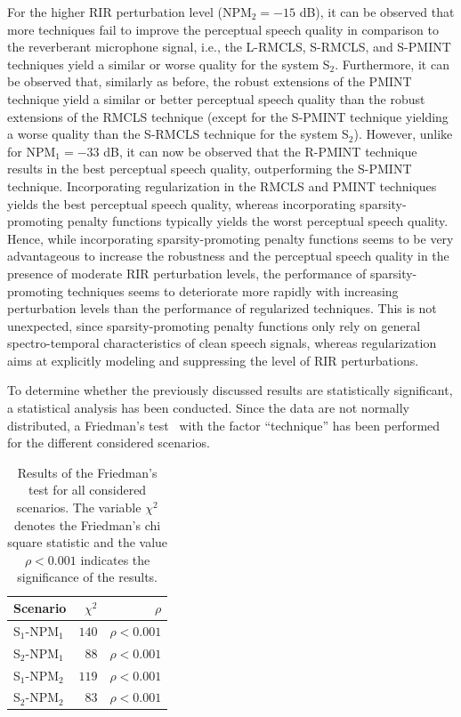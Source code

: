 \documentclass[fleqn]{aes2e}
\begin{document}
For the higher RIR perturbation level (NPM$_2 = -15$ dB), it can be observed that more techniques fail to improve the perceptual speech quality in comparison to the reverberant microphone signal, i.e., the L-RMCLS, S-RMCLS, and S-PMINT techniques yield a similar or worse quality for the system S$_2$.
Furthermore, it can be observed that, similarly as before, the robust extensions of the PMINT technique yield a similar or better perceptual speech quality than the robust extensions of the RMCLS technique (except for the S-PMINT technique yielding a worse quality than the S-RMCLS technique for the system S$_2$).
However, unlike for NPM$_1 = -33$ dB, it can now be observed that the R-PMINT technique results in the best perceptual speech quality, outperforming the S-PMINT technique.
Incorporating regularization in the RMCLS and PMINT techniques yields the best perceptual speech quality, whereas incorporating sparsity-promoting penalty functions typically yields the worst perceptual speech quality.
Hence, while incorporating sparsity-promoting penalty functions seems to be very advantageous to increase the robustness and the perceptual speech quality in the presence of moderate RIR perturbation levels, the performance of sparsity-promoting techniques seems to deteriorate more rapidly with increasing perturbation levels than the performance of regularized techniques.
This is not unexpected, since sparsity-promoting penalty functions only rely on general spectro-temporal characteristics of clean speech signals, whereas regularization aims at explicitly modeling and suppressing the level of RIR perturbations.


To determine whether the previously discussed results are statistically significant, a statistical analysis has been conducted.
Since the data are not normally distributed, a Friedman's test~\cite{Friedman} with the factor ``technique'' has been performed for the different considered scenarios.
\begin{table}[t!]  
\begin{center}
  \caption{Results of the Friedman's test for all considered scenarios. The variable $\chi^2$ denotes the Friedman's chi square statistic and the value $\rho < 0.001$ indicates the significance of the results.}
  \label{tbl: friedman}
  \begin{tabularx}{\linewidth}{Xrr} 
    \toprule
    Scenario & $\chi^2$ & $\rho$ \\
    \toprule 
    S$_1$-NPM$_1$ & $140$ & $\rho < 0.001$ \\
    S$_2$-NPM$_1$ & $88$ & $\rho < 0.001$ \\
    S$_1$-NPM$_2$ & $119$ & $\rho < 0.001$ \\
    S$_2$-NPM$_2$ & $83$ & $\rho < 0.001$ \\
    \bottomrule
  \end{tabularx}
\end{center}
\end{table}
\end{document}
